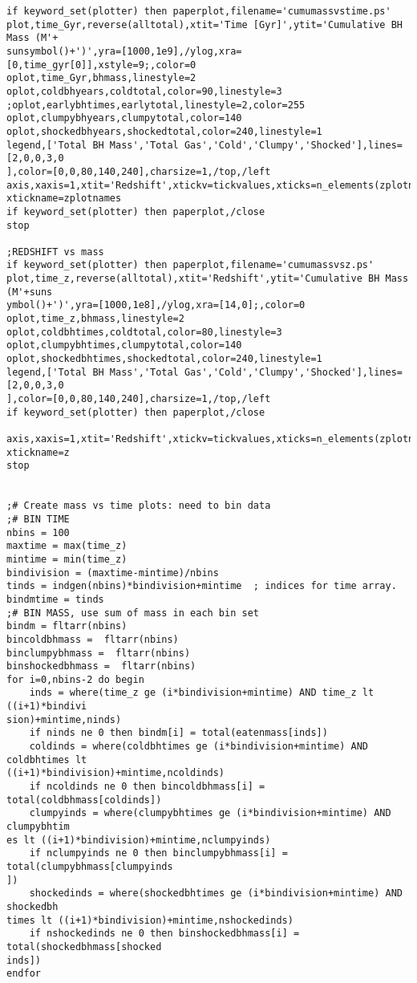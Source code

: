 \documentclass[12pt,headA,chapB]{fiskthesis}
\begin{document}
\begin{verbatim}
if keyword_set(plotter) then paperplot,filename='cumumassvstime.ps'
plot,time_Gyr,reverse(alltotal),xtit='Time [Gyr]',ytit='Cumulative BH Mass (M'+
sunsymbol()+')',yra=[1000,1e9],/ylog,xra=[0,time_gyr[0]],xstyle=9;,color=0
oplot,time_Gyr,bhmass,linestyle=2
oplot,coldbhyears,coldtotal,color=90,linestyle=3
;oplot,earlybhtimes,earlytotal,linestyle=2,color=255
oplot,clumpybhyears,clumpytotal,color=140
oplot,shockedbhyears,shockedtotal,color=240,linestyle=1
legend,['Total BH Mass','Total Gas','Cold','Clumpy','Shocked'],lines=[2,0,0,3,0
],color=[0,0,80,140,240],charsize=1,/top,/left
axis,xaxis=1,xtit='Redshift',xtickv=tickvalues,xticks=n_elements(zplotnames)-1,
xtickname=zplotnames
if keyword_set(plotter) then paperplot,/close
stop

;REDSHIFT vs mass
if keyword_set(plotter) then paperplot,filename='cumumassvsz.ps'
plot,time_z,reverse(alltotal),xtit='Redshift',ytit='Cumulative BH Mass (M'+suns
ymbol()+')',yra=[1000,1e8],/ylog,xra=[14,0];,color=0
oplot,time_z,bhmass,linestyle=2
oplot,coldbhtimes,coldtotal,color=80,linestyle=3
oplot,clumpybhtimes,clumpytotal,color=140
oplot,shockedbhtimes,shockedtotal,color=240,linestyle=1
legend,['Total BH Mass','Total Gas','Cold','Clumpy','Shocked'],lines=[2,0,0,3,0
],color=[0,0,80,140,240],charsize=1,/top,/left
if keyword_set(plotter) then paperplot,/close

axis,xaxis=1,xtit='Redshift',xtickv=tickvalues,xticks=n_elements(zplotnames)-1,
xtickname=z
stop


;# Create mass vs time plots: need to bin data
;# BIN TIME
nbins = 100
maxtime = max(time_z)
mintime = min(time_z)
bindivision = (maxtime-mintime)/nbins
tinds = indgen(nbins)*bindivision+mintime  ; indices for time array.
bindmtime = tinds
;# BIN MASS, use sum of mass in each bin set
bindm = fltarr(nbins)
bincoldbhmass =  fltarr(nbins)
binclumpybhmass =  fltarr(nbins)
binshockedbhmass =  fltarr(nbins)
for i=0,nbins-2 do begin
    inds = where(time_z ge (i*bindivision+mintime) AND time_z lt ((i+1)*bindivi
sion)+mintime,ninds)
    if ninds ne 0 then bindm[i] = total(eatenmass[inds])
    coldinds = where(coldbhtimes ge (i*bindivision+mintime) AND coldbhtimes lt 
((i+1)*bindivision)+mintime,ncoldinds)
    if ncoldinds ne 0 then bincoldbhmass[i] = total(coldbhmass[coldinds])
    clumpyinds = where(clumpybhtimes ge (i*bindivision+mintime) AND clumpybhtim
es lt ((i+1)*bindivision)+mintime,nclumpyinds)
    if nclumpyinds ne 0 then binclumpybhmass[i] = total(clumpybhmass[clumpyinds
])
    shockedinds = where(shockedbhtimes ge (i*bindivision+mintime) AND shockedbh
times lt ((i+1)*bindivision)+mintime,nshockedinds)
    if nshockedinds ne 0 then binshockedbhmass[i] = total(shockedbhmass[shocked
inds])
endfor


\end{verbatim}
\end{document}
